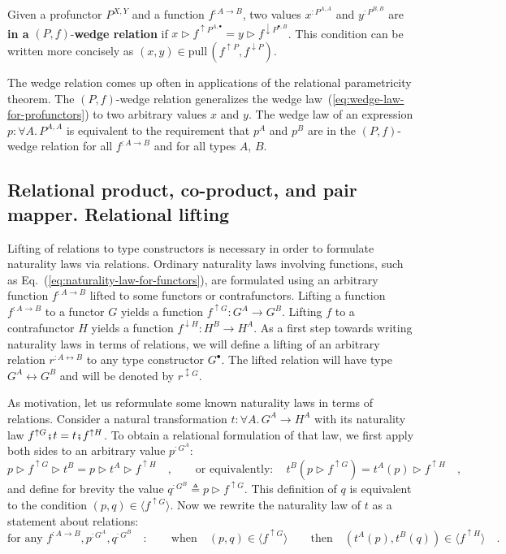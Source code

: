 Given a profunctor
$P^{X,Y}$ and a function $f^{:A\rightarrow B}$, two values $x^{:P^{A,A}}$
and $y^{:P^{B,B}}$ are \textbf{in a} $\left(P,f\right)$-\textbf{wedge
relation} if $x\triangleright f^{\uparrow P^{A,\bullet}}=y\triangleright f^{\downarrow P^{\bullet,B}}$.
This condition can be written more concisely as $(x,y)\in\text{pull}\,(f^{\uparrow P},f^{\downarrow P})$.

The wedge relation comes up often in applications of the relational
parametricity theorem. The $\left(P,f\right)$-wedge relation generalizes
the wedge law~(\ref{eq:wedge-law-for-profunctors}) to two arbitrary
values $x$ and $y$. The wedge law of an expression $p:\forall A.\,P^{A,A}$
is equivalent to the requirement that $p^{A}$ and $p^{B}$ are in
the $\left(P,f\right)$-wedge relation for all $f^{:A\rightarrow B}$
and for all types $A$, $B$. 

\subsection{Relational product, co-product, and pair mapper. Relational lifting}

Lifting of relations to type constructors is necessary in order to
formulate naturality laws via relations. Ordinary naturality laws
involving functions, such as Eq.~(\ref{eq:naturality-law-for-functors}),
are formulated using an arbitrary function $f^{:A\rightarrow B}$
lifted to some functors or contrafunctors. Lifting a function $f^{:A\rightarrow B}$
to a functor $G$ yields a function $f^{\uparrow G}:G^{A}\rightarrow G^{B}$.
Lifting $f$ to a contrafunctor $H$ yields a function $f^{\downarrow H}:H^{B}\rightarrow H^{A}$.
As a first step towards writing naturality laws in terms of relations,
we will define a lifting of an arbitrary relation $r^{:A\leftrightarrow B}$
to any type constructor $G^{\bullet}$. The lifted relation will have
type $G^{A}\leftrightarrow G^{B}$ and will be denoted by $r^{\updownarrow G}$.

As motivation, let us reformulate some known naturality laws in terms
of relations. Consider a natural transformation $t:\forall A.\,G^{A}\rightarrow H^{A}$
with its naturality law $f^{\uparrow G}\bef t=t\bef f^{\uparrow H}$.
To obtain a relational formulation of that law, we first apply both
sides to an arbitrary value $p^{:G^{A}}$:
\[
p\triangleright f^{\uparrow G}\triangleright t^{B}=p\triangleright t^{A}\triangleright f^{\uparrow H}\quad,\quad\quad\text{or equivalently}:\quad t^{B}(p\triangleright f^{\uparrow G})=t^{A}(p)\triangleright f^{\uparrow H}\quad,
\]
and define for brevity the value $q^{:G^{B}}\triangleq p\triangleright f^{\uparrow G}$.
This definition of $q$ is equivalent to the condition $(p,q)\in\langle f^{\uparrow G}\rangle$.
Now we rewrite the naturality law of $t$ as a statement about relations:
\begin{equation}
\text{for any }f^{:A\rightarrow B},p^{:G^{A}},q^{:G^{B}}\quad:\quad\quad\text{when}\quad(p,q)\in\langle f^{\uparrow G}\rangle\quad\quad\text{then}\quad(t^{A}(p),t^{B}(q))\in\langle f^{\uparrow H}\rangle\quad.\label{eq:naturality-law-of-t-derivation1}
\end{equation}

